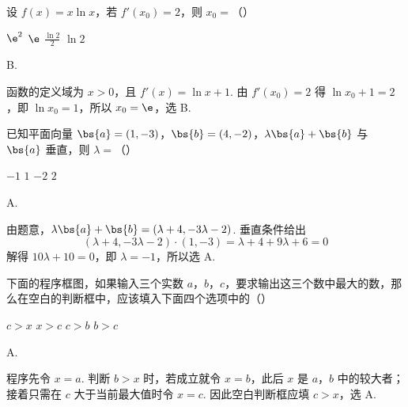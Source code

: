 \begin{problem}
设 \( f(x) = x \ln x \)，若 \( f'(x_0) = 2 \)，则 \( x_0 = \)（\quad）

\choices
    {\(\e^2\)}
    {\(\e\)}
    {\(\frac{\ln 2}{2}\)}
    {\(\ln 2\)}
\end{problem}

\begin{answer}
B.
\end{answer}

\begin{solution}
函数的定义域为 \(x>0\)，且 \(f'(x)=\ln x+1\). 由 \(f'(x_0)=2\) 得 \(\ln x_0+1=2\)，即 \(\ln x_0=1\)，所以 \(x_0=\e\)，选 B.
\end{solution}

\begin{problem}
已知平面向量 \(\bs{a} = (1, -3)\)，\(\bs{b} = (4, -2)\)，\(\lambda \bs{a} + \bs{b}\) 与 \(\bs{a}\) 垂直，则 \(\lambda =\)（\quad）

\choices
    {\(-1\)}
    {\(1\)}
    {\(-2\)}
    {\(2\)}
\end{problem}

\begin{answer}
A.
\end{answer}

\begin{solution}
由题意，\(\lambda\bs{a}+\bs{b}=(\lambda+4,-3\lambda-2)\). 垂直条件给出
\[
(\lambda+4,-3\lambda-2)\cdot(1,-3)=\lambda+4+9\lambda+6=0
\]
解得 \(10\lambda+10=0\)，即 \(\lambda=-1\)，所以选 A.
\end{solution}

\begin{problem}
下面的程序框图，如果输入三个实数 \(a\)，\(b\)，\(c\)，要求输出这三个数中最大的数，那么在空白的判断框中，应该填入下面四个选项中的（\quad）

\FloatBarrier

\choices
    {\(c > x\)}
    {\(x > c\)}
    {\(c > b\)}
    {\(b > c\)}
\end{problem}

\begin{answer}
A.
\end{answer}

\begin{solution}
程序先令 \(x=a\). 判断 \(b>x\) 时，若成立就令 \(x=b\)，此后 \(x\) 是 \(a\)，\(b\) 中的较大者；接着只需在 \(c\) 大于当前最大值时令 \(x=c\). 因此空白判断框应填 \(c>x\)，选 A.
\end{solution}


